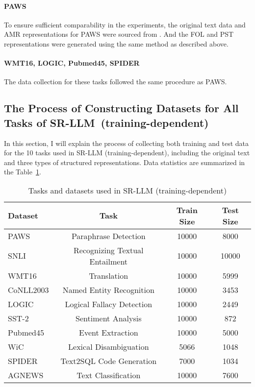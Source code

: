 \paragraph{PAWS}
To ensure sufficient comparability in the experiments, the original text data and AMR representations for PAWS were sourced from \citet{jin2024analyzing}. And the FOL and PST representations were generated using the same method as described above.

\paragraph{WMT16, LOGIC, Pubmed45, SPIDER}
The data collection for these tasks followed the same procedure as PAWS.

\subsection{The Process of Constructing Datasets for All Tasks of SR-LLM~(training-dependent)}
\label{app:dataset_td}
In this section, I will explain the process of collecting both training and test data for the 10 tasks used in SR-LLM (training-dependent), including the original text and three types of structured representations. Data statistics are summarized in the Table~\ref{tab:dataset_of_td}.


\setlength{\tabcolsep}{4.5pt}
\renewcommand{\arraystretch}{1.2}
\begin{table}[!ht]
\centering
\caption{Tasks and datasets used in SR-LLM (training-dependent)}
\label{tab:dataset_of_td}
\small
\resizebox{\linewidth}{!}
{ 
\begin{tabular}{lccc}
\toprule
\textbf{Dataset} & \textbf{Task} & \textbf{Train Size} & \textbf{Test Size} \\
\midrule
PAWS      & Paraphrase Detection           & 10000  & 8000  \\
SNLI      & Recognizing Textual Entailment & 10000  & 10000 \\
WMT16     & Translation                    & 10000  & 5999  \\
CoNLL2003 & Named Entity Recognition       & 10000  & 3453  \\
LOGIC     & Logical Fallacy Detection      & 10000  & 2449  \\
SST-2     & Sentiment Analysis             & 10000  & 872   \\
Pubmed45  & Event Extraction               & 10000  & 5000  \\
WiC       & Lexical Disambiguation         & 5066   & 1048  \\
SPIDER    & Text2SQL Code Generation       & 7000   & 1034  \\
AGNEWS    & Text Classification            & 10000  & 7600  \\
\bottomrule
\end{tabular}
} 
\end{table}


